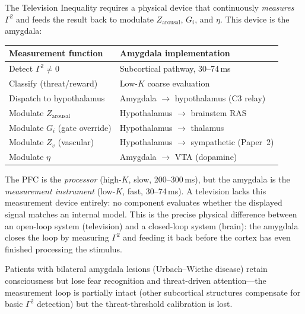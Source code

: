 \documentclass[aps,pre,twocolumn,superscriptaddress,floatfix]{revtex4-2}
\begin{document}
\begin{remark}
\label{rem:measurement-loop}
The Television Inequality requires a physical device
that continuously \emph{measures} $\Gamma^2$ and feeds
the result back to modulate $Z_{\text{arousal}}$,
$G_i$, and $\eta$.
This device is the amygdala:
\begin{center}
\begin{tabular}{ll}
\toprule
Measurement function & Amygdala implementation \\
\midrule
Detect $\Gamma^2 \neq 0$ &
  Subcortical pathway, 30--74\,ms \\
Classify (threat/reward) &
  Low-$K$ coarse evaluation \\
Dispatch to hypothalamus &
  Amygdala $\to$ hypothalamus (C3 relay) \\
Modulate $Z_{\text{arousal}}$ &
  Hypothalamus $\to$ brainstem RAS \\
Modulate $G_i$ (gate override) &
  Hypothalamus $\to$ thalamus \\
Modulate $Z_v$ (vascular) &
  Hypothalamus $\to$ sympathetic (Paper~2) \\
Modulate $\eta$ &
  Amygdala $\to$ VTA (dopamine) \\
\bottomrule
\end{tabular}
\end{center}
The PFC is the \emph{processor} (high-$K$, slow,
200--300\,ms), but the amygdala is the
\emph{measurement instrument} (low-$K$, fast,
30--74\,ms).
A television lacks this measurement device entirely:
no component evaluates whether the displayed signal
matches an internal model.
This is the precise physical difference between an
open-loop system (television) and a closed-loop system
(brain): the amygdala closes the loop by measuring
$\Gamma^2$ and feeding it back before the cortex has
even finished processing the stimulus.

Patients with bilateral amygdala lesions
(Urbach--Wiethe disease) retain consciousness but lose
fear recognition and threat-driven attention---the
measurement loop is partially intact (other subcortical
structures compensate for basic $\Gamma^2$ detection)
but the threat-threshold calibration is lost.
\end{remark}
\end{document}
